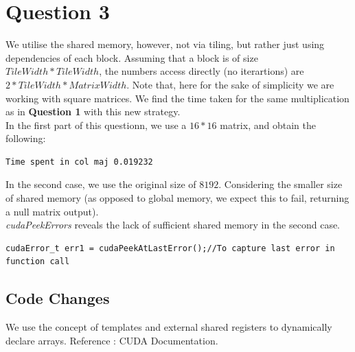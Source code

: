\section {Question 3 }

We utilise the shared memory, however, not via tiling, but rather just using dependencies of each block.  Assuming that a block is of size $Tile Width * Tile Width$, the numbers access directly (no iterartions) are $2 * Tile Width * Matrix Width$. Note that, here for the sake of simplicity we are working with square matrices. We find the time taken for the same multiplication as in \textbf{Question 1} with this new strategy. \\

In the first part of this questionn, we use a $16 * 16$ matrix, and obtain the following:

\begin{lstlisting}[numbers = none]
Time spent in col maj 0.019232
\end{lstlisting}

In the second case, we use the original size of $8192$. Considering the smaller size of shared memory (as opposed to global memory, we expect this to fail, returning a null matrix output). \\

\textit{cudaPeekErrors} reveals the lack of sufficient shared memory in the second case. \\

\begin{lstlisting}[numbers = none]
 cudaError_t err1 = cudaPeekAtLastError();//To capture last error in function call
\end{lstlisting}

\subsection{Code Changes}

We use the concept of templates and external shared registers to dynamically declare arrays. Reference : CUDA Documentation. \\

